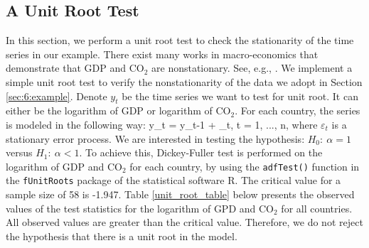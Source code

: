 \subsection{A Unit Root Test} 
In this section, we perform a unit root test to check the stationarity of the time series in our example. There exist many works in macro-economics that demonstrate that GDP and CO$_2$ are nonstationary. See, e.g., \cite{wagner2008}. We implement a simple unit root test to verify the nonstationarity of the data we adopt in Section \ref{sec:6:example}. Denote $y_t$ be the time series we want to test for unit root. It can either be the logarithm of GDP or logarithm of CO$_2$. For each country, the series is modeled in the following way:
\bestar
y_t = \alpha y_{t-1} + \varepsilon_t, \quad t = 1, ..., n,
\eestar
where $\varepsilon_t$ is a stationary error process. We are interested in testing the hypothesis: $H_0:\ \alpha=1\quad$ versus $H_1:\ \alpha < 1$. To achieve this, Dickey-Fuller test is performed on the logarithm of GDP and CO$_2$ for each country, by using the \texttt{adfTest()} function in the \texttt{fUnitRoots} package of the statistical software R. The critical value for a sample size of 58 is -1.947. Table \ref{unit_root_table} below presents the observed values of the test statistics for the logarithm of GPD and CO$_2$ for all countries. All observed values are greater than the critical value. Therefore,  we do not reject the hypothesis that there is a unit root in the model.

\begin{table}[!ht]
\selectfont \caption{Dickey-Fuller Test Results}
\label{unit_root_table} 
\end{table}

